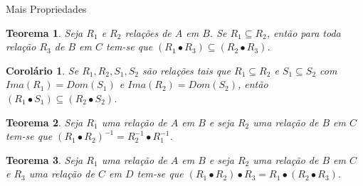 \documentclass[aspectratio=169]{beamer}
\newtheorem{teo}{Teorema}
\newtheorem{col}{Corolário}
\begin{document}
	\begin{frame}{Mais Propriedades}
		\begin{teo}
			Seja $R_1$ e $R_2$ relações de $A$ em $B$. Se $R_1 \subseteq R_2$, então para toda relação $R_3$ de $B$ em $C$ tem-se que $(R_1 \bullet R_3) \subseteq (R_2 \bullet R_3)$.
		\end{teo}
		\begin{col}
			Se $R_1, R_2, S_1, S_2$ são relações tais que $R_1 \subseteq R_2$ e $S_1 \subseteq S_2$ com $Ima(R_1) = Dom(S_1)$ e $Ima(R_2) = Dom(S_2)$, então $(R_1 \bullet S_1) \subseteq (R_2 \bullet S_2)$.
		\end{col}
		\begin{teo}
			Seja $R_1$ uma relação de $A$ em $B$ e seja $R_2$ uma relação de $B$ em $C$ tem-se que $(R_1 \bullet R_2)^{-1} = R_2^{-1} \bullet R_1^{-1}$.
		\end{teo}
		\begin{teo}
			Seja $R_1$ uma relação de $A$ em $B$ e seja $R_2$ uma relação de $B$ em $C$ e $R_3$ uma relação de $C$ em $D$ tem-se que $(R_1 \bullet R_2) \bullet R_3 = R_1 \bullet (R_2 \bullet R_3)$.
		\end{teo}
	\end{frame}
\end{document}

